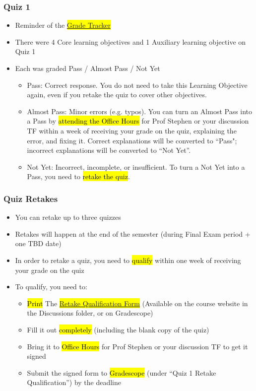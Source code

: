 \begin{frame}
    \frametitle{Quiz 1}
    \begin{itemize}
        \item Reminder of the \hl{\href{https://docs.google.com/spreadsheets/d/1yAqE1HUeVbe6xuhddNSIX7Y3zuvFHlsuIn8Ys7V9_a0}{Grade Tracker}}
        \item There were 4 Core learning objectives and 1 Auxiliary learning objective on Quiz 1
        \item Each was graded Pass / Almost Pass / Not Yet
        \begin{itemize}
            \item Pass: Correct response. You do not need to take this Learning Objective again, even if you retake the quiz to cover other objectives.
            \item Almost Pass: Minor errors (e.g. typos). You can turn an Almost Pass into a Pass by \hl{attending the Office Hours} for Prof Stephen or your discussion TF within a week of receiving your grade on the quiz, explaining the error, and fixing it. Correct explanations will be converted to ``Pass"; incorrect explanations will be converted to ``Not Yet''.
            \item Not Yet: Incorrect, incomplete, or insufficient. To turn a Not Yet into a Pass, you need to \hl{retake the quiz}.
        \end{itemize}
    \end{itemize}
\end{frame}

\begin{frame}
\frametitle{Quiz Retakes}
    \begin{itemize}
        \item You can retake up to three quizzes
        \item Retakes will happen at the end of the semester (during Final Exam period + one TBD date)
        \item In order to retake a quiz, you need to \hl{qualify} within one week of receiving your grade on the quiz
        \item To qualify, you need to:
        \begin{itemize}
            \item \hl{Print} The \hl{\href{https://learn.bu.edu/ultra/courses/_246685_1/outline/file/_16630786_1}{Retake Qualification Form}} (Available on the course website in the Discussions folder, or on Gradescope)
            \item Fill it out \hl{completely} (including the blank copy of the quiz)
            \item Bring it to \hl{Office Hours} for Prof Stephen or your discussion TF to get it signed
            \item Submit the signed form to \hl{Gradescope} (under ``Quiz 1 Retake Qualification'') by the deadline
        \end{itemize}
    \end{itemize}
\end{frame}

